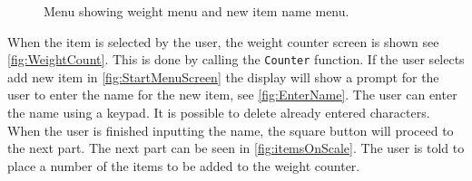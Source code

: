 \begin{figure}[H]
	\centering
	\hfill
	\caption{Menu showing weight menu and new item name menu.}	
\end{figure}

When the item is selected by the user, the weight counter screen is shown see \cref{fig:WeightCount}. This is done by calling the \texttt{Counter} function. 
If the user selects add new item in \cref{fig:StartMenuScreen} the display will show a prompt for the user to enter the name for the new item, see \cref{fig:EnterName}.
The user can enter the name using a keypad. It is possible to delete already entered characters. When the user is finished inputting the name, the square button will proceed to the next part. The next part can be seen in \cref{fig:itemsOnScale}. The user is told to place a number of the items to be added to the weight counter.

